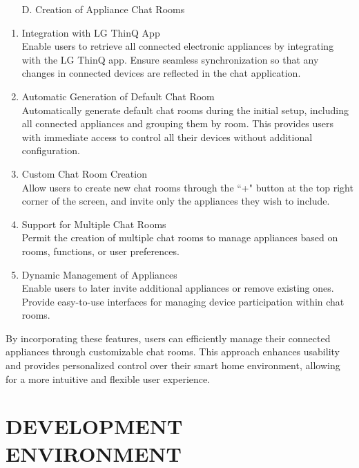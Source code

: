 \documentclass[conference]{IEEEtran}
\begin{document}
\begin{itemize}
    \item [D.] Creation of Appliance Chat Rooms
\end{itemize}

\begin{enumerate}
    \item Integration with LG ThinQ App \\
    Enable users to retrieve all connected electronic appliances by integrating with the LG ThinQ app. Ensure seamless synchronization so that any changes in connected devices are reflected in the chat application.

    \item Automatic Generation of Default Chat Room \\
    Automatically generate default chat rooms during the initial setup, including all connected appliances and grouping them by room. This provides users with immediate access to control all their devices without additional configuration.

    \item Custom Chat Room Creation \\
    Allow users to create new chat rooms through the ``+" button at the top right corner of the screen, and invite only the appliances they wish to include.

    \item Support for Multiple Chat Rooms \\
    Permit the creation of multiple chat rooms to manage appliances based on rooms, functions, or user preferences.

    \item Dynamic Management of Appliances \\
    Enable users to later invite additional appliances or remove existing ones. Provide easy-to-use interfaces for managing device participation within chat rooms.
\end{enumerate}

By incorporating these features, users can efficiently manage their connected appliances through customizable chat rooms. This approach enhances usability and provides personalized control over their smart home environment, allowing for a more intuitive and flexible user experience. \\

\section{DEVELOPMENT ENVIRONMENT}
\end{document}
